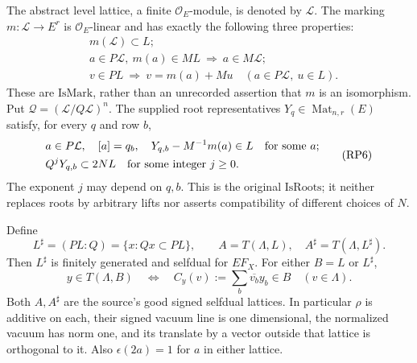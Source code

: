 The abstract level lattice, a finite \(\mathcal O_E\)-module,
is denoted by \(\mathcal L\).
The marking \(m:\mathcal L\to E^r\) is \(\mathcal O_E\)-linear and
has exactly the following three properties:
\[
 \begin{split}
 &m(\mathcal L)\subset L;\\
 &a\in P\mathcal L,\ m(a)\in ML
                              \ \Longrightarrow\ a\in M\mathcal L;\\
 &v\in PL\ \Longrightarrow\
           v=m(a)+Mu\quad(a\in P\mathcal L,\ u\in L).
 \end{split}                                                   \tag{RP5}
\]
These are \(\mathrm{IsMark}\), rather than an unrecorded assertion
that \(m\) is an isomorphism. Put
\(\mathcal Q=(\mathcal L/Q\mathcal L)^n\).
The supplied root representatives \(Y_q\in\operatorname{Mat}_{n,r}(E)\)
satisfy, for every \(q\) and row \(b\),
\[
 \begin{split}
 &a\in P\mathcal L,\quad [a]=q_b,\quad
                         Y_{q,b}-M^{-1}m(a)\in L
                         \quad\hbox{for some }a;\\
 &Q^jY_{q,b}\subset 2NL\quad\hbox{for some integer }j\geq0.
 \end{split}                                                   \tag{RP6}
\]
The exponent \(j\) may depend on \(q,b\). This is the original
\(\mathrm{IsRoots}\); it neither replaces roots by arbitrary lifts
nor asserts compatibility of different choices of \(N\).

\begin{srlemma}
\label{lem:ftb-root-tensor-shift}
Define
\[
 L^\sharp=(PL:Q)=\{x:Qx\subset PL\},\qquad
 A=T(\Lambda,L),\quad A^\sharp=T(\Lambda,L^\sharp).
\]
Then \(L^\sharp\) is finitely generated and selfdual for \(EF_X\).
For either \(B=L\) or \(L^\sharp\),
\[
 y\in T(\Lambda,B)
 \quad\Longleftrightarrow\quad
 C_y(v):=\sum_b\overline{v_b}y_b\in B
                                      \quad(v\in\Lambda). \tag{RP7}
\]
Both \(A,A^\sharp\) are the source's good signed selfdual lattices.
In particular \(\rho\) is additive on each, their signed vacuum
line is one dimensional, the normalized vacuum has norm one,
and its translate by a vector outside that lattice is orthogonal
to it. Also \(\epsilon(2a)=1\) for \(a\) in either lattice.
\end{srlemma}

